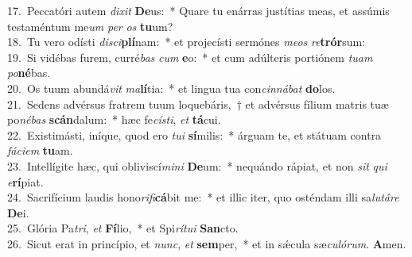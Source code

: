 {17.~}Peccatóri autem \textit{di}\textit{xit} \textbf{De}us:~* Quare tu enárras justítias meas, et assúmis testaméntum me\textit{um} \textit{per} \textit{os} \textbf{tu}um?\\
{18.~}Tu vero odísti \textit{di}\textit{sci}\textbf{plí}nam:~* et projecísti sermónes \textit{me}\textit{os} \textit{re}\textbf{trór}sum:\\
{19.~}Si vidébas furem, curré\textit{bas} \textit{cum} \textbf{e}o:~* et cum adúlteris portiónem \textit{tu}\textit{am} \textit{po}\textbf{né}bas.\\
{20.~}Os tuum abundá\textit{vit} \textit{ma}\textbf{lí}tia:~* et lingua tua con\textit{cin}\textit{ná}\textit{bat} \textbf{do}los.\\
{21.~}Sedens advérsus fratrem tuum loquebáris,~† et advérsus fílium matris tuæ po\textit{né}\textit{bas} \textbf{scán}dalum:~* hæc fe\textit{cí}\textit{sti}, \textit{et} \textbf{tá}cui.\\
{22.~}Existimásti, iníque, quod ero \textit{tu}\textit{i} \textbf{sí}milis:~* árguam te, et státuam contra \textit{fá}\textit{ci}\textit{em} \textbf{tu}am.\\
{23.~}Intellígite hæc, qui obliviscí\textit{mi}\textit{ni} \textbf{De}um:~* nequándo rápiat, et non \textit{sit} \textit{qui} \textit{e}\textbf{rí}piat.\\
{24.~}Sacrifícium laudis hono\textit{ri}\textit{fi}\textbf{cá}bit me:~* et illic iter, quo osténdam illi sa\textit{lu}\textit{tá}\textit{re} \textbf{De}i.\\
{25.~}Glória Pa\textit{tri}, \textit{et} \textbf{Fí}lio,~* et Spi\textit{rí}\textit{tu}\textit{i} \textbf{San}cto.\\
{26.~}Sicut erat in princípio, et \textit{nunc}, \textit{et} \textbf{sem}per,~* et in sǽcula sæ\textit{cu}\textit{ló}\textit{rum}. \textbf{A}men.\\
